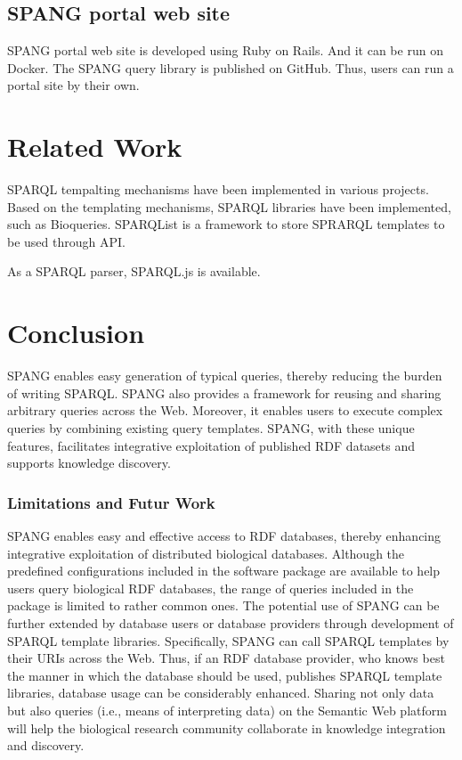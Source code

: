 \documentclass[runningheads]{llncs}
\begin{document}
\subsection{SPANG portal web site}
SPANG portal web site is developed using Ruby on Rails. And it can be run on Docker. The SPANG query library is published on GitHub. Thus, users can run a portal site by their own.




\section{Related Work}

SPARQL tempalting mechanisms have been implemented in various projects. Based on the templating mechanisms, SPARQL libraries have been implemented, such as Bioqueries. SPARQList is a framework to store SPRARQL templates to be used through API.

As a SPARQL parser, SPARQL.js is available.


\section{Conclusion}
SPANG enables easy generation of typical queries, thereby reducing the burden of writing SPARQL. SPANG also provides a framework for reusing and sharing arbitrary queries across the Web. Moreover, it enables users to execute complex queries by combining existing query templates. SPANG, with these unique features, facilitates integrative exploitation of published RDF datasets and supports knowledge discovery. 

\subsubsection{Limitations and Futur Work}
SPANG enables easy and effective access to RDF databases, thereby enhancing integrative exploitation of distributed biological databases.
Although the predefined configurations included in the software package are available to help users query biological RDF databases, 
the range of queries included in the package is limited to rather common ones.
The potential use of SPANG can be further extended by database users or database providers through development of SPARQL template libraries.
Specifically, SPANG can call SPARQL templates by their URIs across the Web.
Thus, if an RDF database provider,
who knows best the manner in which the database should be used,
publishes SPARQL template libraries, database usage can be considerably enhanced.
Sharing not only data but also queries (i.e., means of interpreting data) on the Semantic Web platform will help the biological research community collaborate in knowledge integration and discovery.
\end{document}
